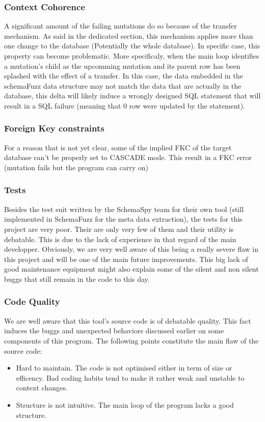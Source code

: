 \documentclass{article}
\begin{document}
\begin{empfile}
			\subsubsection{Context Cohorence}
A significant amount of the failing mutations do so because of the transfer mechanism. As said in the dedicated section, this mechanism applies more than one change to the database (Potentially the whole database). In specific case, this property can become problematic. 
More specificaly, when the main loop identifies a mutation's child as the upcomming mutation and its parent row has been splashed with the effect of a transfer. In this case, the data embedded in the schemaFuzz data structure may not match the data that are actually in the database, this delta will likely induce a wrongly designed SQL statement that will result in a SQL failure (meaning that 0 row were updated by the statement).
			\subsubsection{Foreign Key constraints}			
For a reason that is not yet clear, some of the implied FKC of the target database can't be properly set to CASCADE mode. This result in a FKC error (mutation fails but the program can carry on)			
			\subsubsection{Tests}
Besides the test suit written by the SchemaSpy team for their own tool (still implemented in SchemaFuzz for the meta data extraction), the tests for this project are very poor. Their are only very few of them and their utility is debatable. This is due to the lack of experience in that regard of the main developper. Obviously, we are very well aware of this being a really severe flaw in this project and will be one of the main future improvements.
This big lack of good maintenance equipment might also explain some of the silent and non silent buggs that still remain in the code to this day.

			\subsubsection{Code Quality}
We are well aware that this tool's source code is of debatable quality. This fact induces the  buggs and unexpected behaviors discussed earlier on some components of this program. 
The following points constitute the main flaw of the source code:
			\begin{itemize}
			\item Hard to maintain. The code is not optimised either in term of size or 			efficency. Bad coding habits tend to make it rather weak and unstable to context changes.
			\item Structure is not intuitive. The main loop of the program lacks a good 		structure.
			\end{itemize}
 			

\end{empfile}
\end{document}
